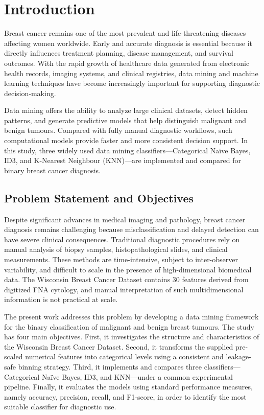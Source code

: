 \documentclass[conference]{IEEEtran}
\begin{document}
\section{Introduction}
Breast cancer remains one of the most prevalent and life-threatening diseases affecting women worldwide. Early and accurate diagnosis is essential because it directly influences treatment planning, disease management, and survival outcomes. With the rapid growth of healthcare data generated from electronic health records, imaging systems, and clinical registries, data mining and machine learning techniques have become increasingly important for supporting diagnostic decision-making.

Data mining offers the ability to analyze large clinical datasets, detect hidden patterns, and generate predictive models that help distinguish malignant and benign tumours. Compared with fully manual diagnostic workflows, such computational models provide faster and more consistent decision support. In this study, three widely used data mining classifiers---Categorical Na\"ive Bayes, ID3, and K-Nearest Neighbour (KNN)---are implemented and compared for binary breast cancer diagnosis.

\subsection{Problem Statement and Objectives}
Despite significant advances in medical imaging and pathology, breast cancer diagnosis remains challenging because misclassification and delayed detection can have severe clinical consequences. Traditional diagnostic procedures rely on manual analysis of biopsy samples, histopathological slides, and clinical measurements. These methods are time-intensive, subject to inter-observer variability, and difficult to scale in the presence of high-dimensional biomedical data. The Wisconsin Breast Cancer Dataset contains 30 features derived from digitized FNA cytology, and manual interpretation of such multidimensional information is not practical at scale.

The present work addresses this problem by developing a data mining framework for the binary classification of malignant and benign breast tumours. The study has four main objectives. First, it investigates the structure and characteristics of the Wisconsin Breast Cancer Dataset. Second, it transforms the supplied pre-scaled numerical features into categorical levels using a consistent and leakage-safe binning strategy. Third, it implements and compares three classifiers---Categorical Na\"ive Bayes, ID3, and KNN---under a common experimental pipeline. Finally, it evaluates the models using standard performance measures, namely accuracy, precision, recall, and F1-score, in order to identify the most suitable classifier for diagnostic use.
\end{document}
